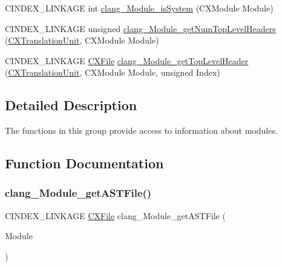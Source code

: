 \begin{DoxyCompactItemize}
\item 
C\+I\+N\+D\+E\+X\+\_\+\+L\+I\+N\+K\+A\+GE int \hyperlink{group__CINDEX__MODULE_ga1e4ad74c404b5f3bcd30cec4dc12fa34}{clang\+\_\+\+Module\+\_\+is\+System} (C\+X\+Module Module)
\item 
C\+I\+N\+D\+E\+X\+\_\+\+L\+I\+N\+K\+A\+GE unsigned \hyperlink{group__CINDEX__MODULE_gaee667293d56a18d3e8c17e37ce77cb0d}{clang\+\_\+\+Module\+\_\+get\+Num\+Top\+Level\+Headers} (\hyperlink{group__CINDEX_gacdb7815736ca709ce9a5e1ec2b7e16ac}{C\+X\+Translation\+Unit}, C\+X\+Module Module)
\item 
C\+I\+N\+D\+E\+X\+\_\+\+L\+I\+N\+K\+A\+GE \hyperlink{group__CINDEX__FILES_gacfcea9c1239c916597e2e5b3e109215a}{C\+X\+File} \hyperlink{group__CINDEX__MODULE_ga08aa0746251ca2e8eee69c8fe7c15e2b}{clang\+\_\+\+Module\+\_\+get\+Top\+Level\+Header} (\hyperlink{group__CINDEX_gacdb7815736ca709ce9a5e1ec2b7e16ac}{C\+X\+Translation\+Unit}, C\+X\+Module Module, unsigned Index)
\end{DoxyCompactItemize}


\subsection{Detailed Description}
The functions in this group provide access to information about modules. 

\subsection{Function Documentation}
\mbox{\label{group__CINDEX__MODULE_gaa5095dd877556655d096d3165e86b0e1}} 
\subsubsection{\texorpdfstring{clang\+\_\+\+Module\+\_\+get\+A\+S\+T\+File()}{clang\_Module\_getASTFile()}}
{\footnotesize\ttfamily C\+I\+N\+D\+E\+X\+\_\+\+L\+I\+N\+K\+A\+GE \hyperlink{group__CINDEX__FILES_gacfcea9c1239c916597e2e5b3e109215a}{C\+X\+File} clang\+\_\+\+Module\+\_\+get\+A\+S\+T\+File (\begin{DoxyParamCaption}\item[{C\+X\+Module}]{Module }\end{DoxyParamCaption})}


